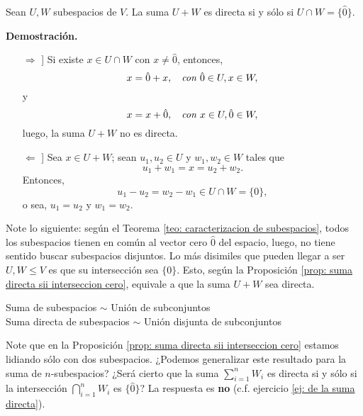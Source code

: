 \begin{prop}
	\label{prop: suma directa sii interseccion cero}
Sean $U, W$ subespacios de $V$. La suma
$U+ W$ es directa si y sólo si $U \cap W = \{ \hat{0} \}$.
\end{prop}
\noindent
\textbf{Demostración.}
\begin{itemize}
	\item[$\Rightarrow$]] Si existe $x \in U \cap W$
	con $x \neq \hat{0}$, entonces, 
	\[
	x = \hat{0} + x, \hspace{0.2cm} \textit{ con }
	\hat{0} \in U, x \in W,
	\]
	y 
	\[
	x = x + \hat{0}, \hspace{0.2cm} \textit{ con }
	x \in U, \hat{0} \in W,
	\]
	luego, la suma $U + W$ no es directa.
	
	\item[$\Leftarrow$]] Sea $x \in U + W$; sean
	$u_{1}, u_{2} \in U$ y $w_{1}, w_{2} \in W$ tales que
	\[
	u_{1} + w_{1} = x = u_{2} + w_{2}.
	\]
	Entonces, 
	\[
	u_{1} - u_{2} = w_{2} - w_{1} \in U \cap W = \{ 0 \},
	\]
	o sea, $u_{1} = u_{2}$ y $w_{1} = w_{2}$.
	
	
\end{itemize}

\QEDB
\vspace{0.2cm}

Note lo siguiente: según el Teorema
\ref{teo: caracterizacion de subespacios},
todos los subespacios tienen en común al 
vector cero $\hat{0}$ del espacio, luego, no tiene sentido
buscar subespacios disjuntos. Lo más disimiles que pueden
llegar a ser $U, W \leq V$ es que su intersección sea
$\{ 0 \}$. Esto, según la Proposición 
\ref{prop: suma directa sii interseccion cero}, 
equivale a que la suma $U + W$ sea directa.


\begin{center}
Suma de subespacios $\sim$ Unión de subconjuntos \\
Suma directa de subespacios 
$\sim$ Unión disjunta de subconjuntos
\end{center}

Note que en la Proposición \ref{prop: suma directa sii interseccion cero}
estamos lidiando sólo con dos subespacios. ¿Podemos generalizar
este resultado para la suma de $n$-subespacios? ¿Será cierto que
la suma $\sum_{i=1}^{n} W_{i}$ es directa si y sólo si 
la intersección $\bigcap_{i = 1}^{n} W_{i}$ es $\{ \hat{0} \}$?
La respuesta es \textbf{no} (c.f. ejercicio
\ref{ej: de la suma directa}). 


